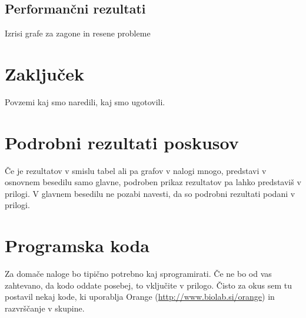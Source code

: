 \documentclass[a4paper,11pt]{article}
\begin{document}
\subsection{Performančni rezultati}
Izrisi grafe za zagone in resene probleme

\section{Zaključek}
Povzemi kaj smo naredili, kaj smo ugotovili.

\appendix
\appendixpage
\section{\label{app-res}Podrobni rezultati poskusov}

Če je rezultatov v smislu tabel ali pa grafov v nalogi mnogo,
predstavi v osnovnem besedilu samo glavne, podroben prikaz
rezultatov pa lahko predstaviš v prilogi. V glavnem besedilu ne
pozabi navesti, da so podrobni rezultati podani v prilogi.

\section{Programska koda}

Za domače naloge bo tipično potrebno kaj sprogramirati. Če ne bo od
vas zahtevano, da kodo oddate posebej, to vključite v prilogo. Čisto
za okus sem tu postavil nekaj kode, ki uporablja Orange
(\url{http://www.biolab.si/orange}) in razvrščanje v skupine.




\end{document}
